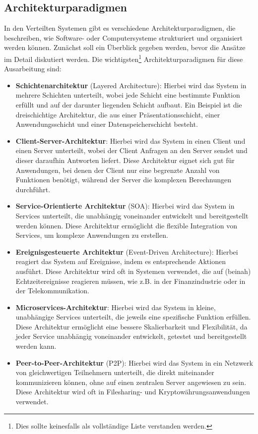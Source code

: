 \documentclass[../vs-script-first-v01.tex]{subfiles}
\begin{document}
\newpage
\label{Woche03}\subsection{Architekturparadigmen}

In den Verteilten Systemen gibt es verschiedene Architekturparadigmen, die beschreiben, wie Software- oder Computersysteme strukturiert und organisiert werden können. 
Zunächst soll ein Überblick gegeben werden, bevor die Ansätze im Detail diskutiert werden. Die wichtigsten\footnote{Dies sollte keinesfalls als vollständige Liste verstanden werden.} Architekturparadigmen für diese Ausarbeitung sind:
\begin{itemize}  
\item \textbf{Schichtenarchitektur} (Layered Architecture): Hierbei wird das System in mehrere Schichten unterteilt, wobei jede Schicht eine bestimmte Funktion erfüllt und auf der darunter liegenden Schicht aufbaut. Ein Beispiel ist die dreischichtige Architektur, die aus einer Präsentationsschicht, einer Anwendungsschicht und einer Datenspeicherschicht besteht.

\item \textbf{Client-Server-Architektur}: Hierbei wird das System in einen Client und einen Server unterteilt, wobei der Client Anfragen an den Server sendet und dieser daraufhin Antworten liefert. Diese Architektur eignet sich gut für Anwendungen, bei denen der Client nur eine begrenzte Anzahl von Funktionen benötigt, während der Server die komplexen Berechnungen durchführt.

\item \textbf{Service-Orientierte Architektur} (SOA): Hierbei wird das System in Services unterteilt, die unabhängig voneinander entwickelt und bereitgestellt werden können. Diese Architektur ermöglicht die flexible Integration von Services, um komplexe Anwendungen zu erstellen.

\item \textbf{Ereignisgesteuerte Architektur} (Event-Driven Architecture): Hierbei reagiert das System auf Ereignisse, indem es entsprechende Aktionen ausführt. Diese Architektur wird oft in Systemen verwendet, die auf (beinah) Echtzeitereignisse reagieren müssen, wie z.B. in der Finanzindustrie oder in der Telekommunikation.

\item \textbf{Microservices-Architektur}: Hierbei wird das System in kleine, unabhängige Services unterteilt, die jeweils eine spezifische Funktion erfüllen. Diese Architektur ermöglicht eine bessere Skalierbarkeit und Flexibilität, da jeder Service unabhängig voneinander entwickelt, getestet und bereitgestellt werden kann.

\item \textbf{Peer-to-Peer-Architektur} (P2P): Hierbei wird das System in ein Netzwerk von gleichwertigen Teilnehmern unterteilt, die direkt miteinander kommunizieren können, ohne auf einen zentralen Server angewiesen zu sein. Diese Architektur wird oft in Filesharing- und Kryptowährungsanwendungen verwendet.
\end{itemize}  
\end{document}
